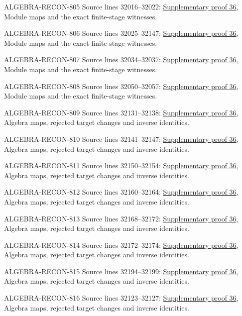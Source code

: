 \begin{AlgebraSourceRoutes}
\item[ALGEBRA-RECON-805] Source lines 32016--32022: \hyperlink{algebra_colimit_categories_notes_20260928}{Supplementary proof 36}, Module maps and the exact finite-stage witnesses.
\item[ALGEBRA-RECON-806] Source lines 32025--32147: \hyperlink{algebra_colimit_categories_notes_20260928}{Supplementary proof 36}, Module maps and the exact finite-stage witnesses.
\item[ALGEBRA-RECON-807] Source lines 32034--32037: \hyperlink{algebra_colimit_categories_notes_20260928}{Supplementary proof 36}, Module maps and the exact finite-stage witnesses.
\item[ALGEBRA-RECON-808] Source lines 32050--32057: \hyperlink{algebra_colimit_categories_notes_20260928}{Supplementary proof 36}, Module maps and the exact finite-stage witnesses.
\item[ALGEBRA-RECON-809] Source lines 32131--32138: \hyperlink{algebra_colimit_categories_notes_20260928}{Supplementary proof 36}, Algebra maps, rejected target changes and inverse identities.
\item[ALGEBRA-RECON-810] Source lines 32141--32147: \hyperlink{algebra_colimit_categories_notes_20260928}{Supplementary proof 36}, Algebra maps, rejected target changes and inverse identities.
\item[ALGEBRA-RECON-811] Source lines 32150--32154: \hyperlink{algebra_colimit_categories_notes_20260928}{Supplementary proof 36}, Algebra maps, rejected target changes and inverse identities.
\item[ALGEBRA-RECON-812] Source lines 32160--32164: \hyperlink{algebra_colimit_categories_notes_20260928}{Supplementary proof 36}, Algebra maps, rejected target changes and inverse identities.
\item[ALGEBRA-RECON-813] Source lines 32168--32172: \hyperlink{algebra_colimit_categories_notes_20260928}{Supplementary proof 36}, Algebra maps, rejected target changes and inverse identities.
\item[ALGEBRA-RECON-814] Source lines 32172--32174: \hyperlink{algebra_colimit_categories_notes_20260928}{Supplementary proof 36}, Algebra maps, rejected target changes and inverse identities.
\item[ALGEBRA-RECON-815] Source lines 32194--32199: \hyperlink{algebra_colimit_categories_notes_20260928}{Supplementary proof 36}, Algebra maps, rejected target changes and inverse identities.
\item[ALGEBRA-RECON-816] Source lines 32123--32127: \hyperlink{algebra_colimit_categories_notes_20260928}{Supplementary proof 36}, Algebra maps, rejected target changes and inverse identities.

\end{AlgebraSourceRoutes}
